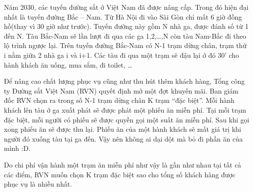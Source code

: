 Năm 2030, các tuyến đường sắt ở Việt Nam đã được nâng cấp. Trong đó hiện đại nhất là tuyến đường Bắc – Nam. Từ Hà Nội đi vào Sài Gòn chỉ mất 6 giờ đồng hồ(thay vì 30 giờ như trước). Tuyến đường này gồm N nhà ga, được đánh số từ 1 đến N. Tàu Bắc-Nam sẽ lần lượt đi qua các ga 1,2,…,N còn tàu Nam-Bắc đi theo lộ trình ngược lại. Trên tuyến đường Bắc-Nam có N-1 trạm dừng chân, trạm thứ i nằm giữa 2 nhà ga i và i+1. Các tàu đi qua một trạm sẽ đậu lại ở đó 30’ cho hành khách ăn uống, mua sắm, đi toilet, …  

   Để nâng cao chất lượng phục vụ cũng như thu hút thêm khách hàng, Tổng công ty Đường sắt Việt Nam (RVN) quyết định mở một đợt khuyến mãi. Ban giám đốc RVN chọn ra trong số N-1 trạm dừng chân K trạm “đặc biệt”. Mỗi hành khách lên tàu ở ga xuất phát sẽ được phát một phiếu ăn miễn phí. Tại mỗi trạm đặc biệt, mỗi người có phiếu sẽ được quyền gọi một suất ăn miễn phí. Sau khi gọi xong phiếu ăn sẽ được thu lại. Phiếu ăn của một hành khách sẽ mất giá trị khi người đó xuống tàu tại ga đến. Vậy nên không ai dại dột mà bỏ đi phần ăn của mình :D.  

   Do chi phí vận hành một trạm ăn miễn phí như vậy là gần như nhau tại tất cả các điểm, RVN muốn chọn K trạm đặc biệt sao cho tổng số khách hàng được phục vụ là nhiều nhất.